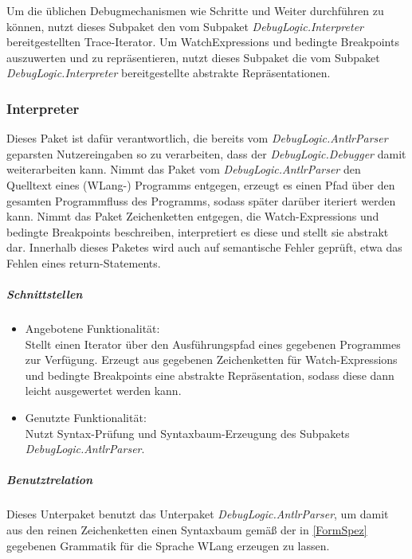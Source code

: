 \documentclass[parskip=full]{scrartcl}
\begin{document}
Um die üblichen Debugmechanismen wie Schritte und Weiter durchführen zu können, nutzt dieses Subpaket den vom Subpaket \textit{DebugLogic.Interpreter} bereitgestellten Trace-Iterator. 
Um WatchExpressions und bedingte Breakpoints auszuwerten und zu repräsentieren, nutzt dieses Subpaket die vom Subpaket \textit{DebugLogic.Interpreter} bereitgestellte abstrakte Repräsentationen.

\subsubsection{Interpreter}
Dieses Paket ist dafür verantwortlich, die bereits vom \textit{DebugLogic.AntlrParser}  geparsten Nutzereingaben so zu verarbeiten, dass der \textit{DebugLogic.Debugger} damit weiterarbeiten kann. Nimmt das Paket vom \textit{DebugLogic.AntlrParser} den Quelltext eines (WLang-) Programms entgegen, erzeugt es einen Pfad über den gesamten Programmfluss des Programms, sodass später darüber iteriert werden kann. Nimmt das Paket Zeichenketten entgegen, die Watch-Expressions und bedingte Breakpoints beschreiben, interpretiert es diese und stellt sie abstrakt dar.
Innerhalb dieses Paketes wird auch auf semantische Fehler geprüft, etwa das Fehlen eines return-Statements.


\subparagraph{Schnittstellen}
\begin{itemize}
\item Angebotene Funktionalität:\\
Stellt einen Iterator über den Ausführungspfad eines gegebenen Programmes zur Verfügung. Erzeugt aus gegebenen Zeichenketten für Watch-Expressions und bedingte Breakpoints eine abstrakte Repräsentation, sodass diese dann leicht ausgewertet werden kann.

\item Genutzte Funktionalität:\\
Nutzt Syntax-Prüfung und Syntaxbaum-Erzeugung des Subpakets \textit{DebugLogic.AntlrParser}. 
\end{itemize}

\subparagraph{Benutztrelation} 
Dieses Unterpaket benutzt das Unterpaket \textit{DebugLogic.AntlrParser}, um damit aus den reinen Zeichenketten einen Syntaxbaum gemäß der in \ref{FormSpez} gegebenen Grammatik für die Sprache WLang erzeugen zu lassen.
\end{document}
